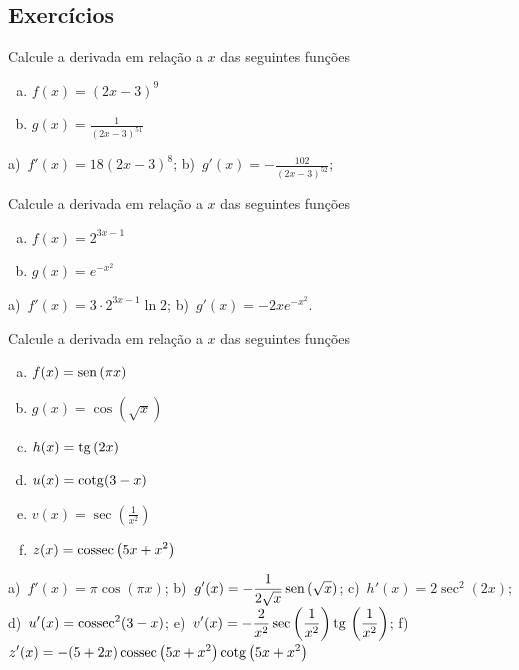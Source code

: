 \cleardoublepage\documentclass[../main.tex]{subfiles}
\begin{document}
\subsection{Exercícios}

\begin{exer}
  Calcule a derivada em relação a $x$ das seguintes funções
  \begin{enumerate}[a)]
  \item $\displaystyle f(x) = (2x-3)^{9}$
  \item $\displaystyle g(x) = \frac{1}{(2x-3)^{51}}$
  \end{enumerate}
\end{exer}
\begin{resp}
  a)~$\displaystyle f'(x) = 18(2x-3)^8$; b)~$\displaystyle g'(x) = -\frac{102}{(2x-3)^{52}}$;
\end{resp}

\begin{exer}
  Calcule a derivada em relação a $x$ das seguintes funções
  \begin{enumerate}[a)]
  \item $\displaystyle f(x) = 2^{3x-1}$
  \item $\displaystyle g(x) = e^{-x^2}$
  \end{enumerate}
\end{exer}
\begin{resp}
  a)~$\displaystyle f'(x) = 3\cdot 2^{3x-1}\ln 2$; b)~$\displaystyle g'(x) = -2xe^{-x^2}$.
\end{resp}

\begin{exer}
  Calcule a derivada em relação a $x$ das seguintes funções
  \begin{multicols}{2}
   \begin{enumerate}[a)]
  \item $\displaystyle f(x) = \operatorname{sen}\,(\pi x)$
  \item $\displaystyle g(x) = \cos(\sqrt{x})$
  \item $\displaystyle h(x) = \operatorname{tg}\,(2x)$
  \item $\displaystyle u(x) = \operatorname{cotg}(3 - x)$
  \item $\displaystyle v(x) = \sec\left(\frac{1}{x^2}\right)$
  \item $\displaystyle z(x) = \operatorname{cossec}\left(5x + x^2\right)$
  \end{enumerate}
  \end{multicols}
 
\end{exer}
\begin{resp}
  a)~$\displaystyle f'(x) = \pi\cos(\pi x)$; b)~$\displaystyle g'(x) = -\frac{1}{2\sqrt{x}}\operatorname{sen}\,(\sqrt{x})$; c)~$\displaystyle h'(x) = 2\sec^2(2x)$; d)~$\displaystyle u'(x) = \operatorname{cossec}^2(3-x)$; e)~$\displaystyle v'(x) = -\frac{2}{x^2}\sec\left(\frac{1}{x^2}\right)\operatorname{tg}\,\left(\frac{1}{x^2}\right)$; f)~$\displaystyle z'(x) = -(5+2x)\operatorname{cossec}\left(5x + x^2\right)\operatorname{cotg}\left(5x + x^2\right)$
\end{resp}
\end{document}
